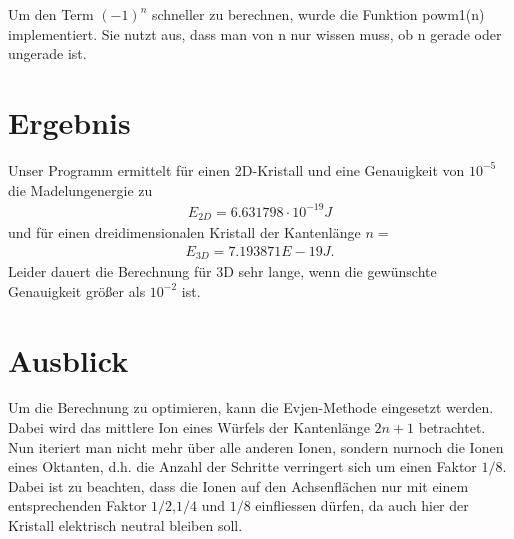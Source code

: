 \documentclass[ngerman]{scrartcl}
\begin{document}
Um den Term $(-1)^{n}$ schneller zu berechnen, wurde die Funktion powm1(n) implementiert. Sie nutzt aus, dass man von n nur wissen muss,
ob n gerade oder ungerade ist.
\section*{Ergebnis}
Unser Programm ermittelt für einen 2D-Kristall und eine Genauigkeit von $10^{-5}$ die Madelungenergie zu
\begin{align*}
	E_{2D} = 6.631798 \cdot 10^{-19} J
\end{align*}
und für einen dreidimensionalen Kristall der Kantenlänge $n = $
\begin{align*}
	E_{3D} = 7.193871E-19 J.
\end{align*}
Leider dauert die Berechnung für 3D sehr lange, wenn die gewünschte Genauigkeit größer als $10^{-2}$ ist.

\section*{Ausblick}
Um die Berechnung zu optimieren, kann die Evjen-Methode eingesetzt werden. Dabei wird das mittlere Ion
eines Würfels der Kantenlänge $2n+1$ betrachtet. Nun iteriert man nicht mehr über alle anderen Ionen,
sondern nurnoch die Ionen eines Oktanten, d.h. die Anzahl der Schritte verringert sich um einen Faktor $1/8$.
Dabei ist zu beachten, dass die Ionen auf den Achsenflächen nur mit einem entsprechenden Faktor $1/2$,$1/4$ und $1/8$
einfliessen dürfen, da auch hier der Kristall elektrisch neutral bleiben soll.
\end{document}
